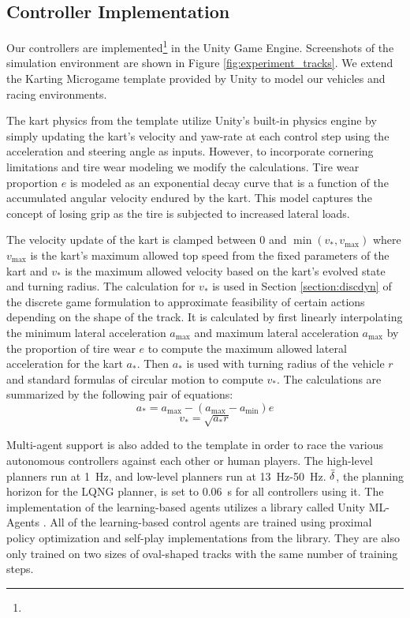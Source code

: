 \subsection{Controller Implementation}
Our controllers are implemented\footnote{\codeurl} in the Unity Game Engine. Screenshots of the simulation environment are shown in Figure \ref{fig:experiment_tracks}. We extend the Karting Microgame template provided by Unity \cite{microkarting} to model our vehicles and racing environments. 

The kart physics from the template utilize Unity's built-in physics engine by simply updating the kart's velocity and yaw-rate at each control step using the acceleration and steering angle as inputs. However, to incorporate cornering limitations and tire wear modeling we modify the calculations. Tire wear proportion $e$ is modeled as an exponential decay curve that is a function of the accumulated angular velocity endured by the kart. This model captures the concept of losing grip as the tire is subjected to increased lateral loads. 

The velocity update of the kart is clamped between 0 and $\min(v_*, v_{\text{max}})$ where $v_{\text{max}}$ is the kart's maximum allowed top speed from the fixed parameters of the kart and $v_*$ is the maximum allowed velocity based on the kart's evolved state and turning radius. The calculation for $v_*$ is used in Section \ref{section:discdyn} of the discrete game formulation to approximate feasibility of certain actions depending on the shape of the track. It is calculated by first linearly interpolating the minimum lateral acceleration $a_{\text{max}}$ and maximum lateral acceleration $a_{\text{max}}$ by the proportion of tire wear $e$ to compute the maximum allowed lateral acceleration for the kart $a_*$. Then $a_*$ is used with turning radius of the vehicle $r$ and standard formulas of circular motion to compute $v_*$. The calculations are summarized by the following pair of equations:
\begin{equation}
     a_* = a_{\text{max}} - (a_{\text{max}}-a_{\text{min}})e
\end{equation}
\begin{equation}
    v_* = \sqrt{a_*r}
\end{equation}

Multi-agent support is also added to the template in order to race the various autonomous controllers against each other or human players. The high-level planners run at \SI{1}{\hertz}, and low-level planners run at \SI{13}{\hertz}-\SI{50}{\hertz}. $\Bar{\delta}$, the planning horizon for the LQNG planner, is set to \SI{0.06}{\second} for all controllers using it. The implementation of the learning-based agents utilizes a library called Unity ML-Agents \cite{mlagents}. All of the learning-based control agents are trained using proximal policy optimization and self-play implementations from the library. They are also only trained on two sizes of oval-shaped tracks with the same number of training steps. 


